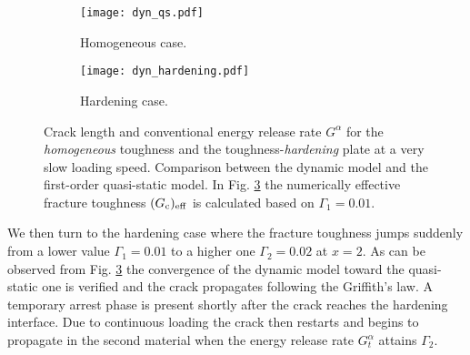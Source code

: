 \begin{figure}[htbp]
\centering
\begin{subfigure}[b]{0.48\textwidth}
\centering
\texttt{[image: dyn\_qs.pdf]}
\caption{Homogeneous case.} \label{fig:homoGcqs}
\end{subfigure}
\begin{subfigure}[b]{0.48\textwidth}
\centering
\texttt{[image: dyn\_hardening.pdf]}
\caption{Hardening case.} \label{fig:hardGcqs}
\end{subfigure}
\caption{Crack length and conventional energy release rate $G^\alpha$ for the \emph{homogeneous} toughness and the toughness-\emph{hardening} plate at a very slow loading speed. Comparison between the dynamic model and the first-order quasi-static model. In Fig. \ref{fig:hardGcqs} the numerically effective fracture toughness $(G_\mathrm{c})_\mathrm{eff}$ is calculated based on $\Gamma_1=0.01$.}
\end{figure}

We then turn to the hardening case where the fracture toughness jumps suddenly from a lower value $\Gamma_1=0.01$ to a higher one $\Gamma_2=0.02$ at $x=2$. As can be observed from Fig. \ref{fig:hardGcqs} the convergence of the dynamic model toward the quasi-static one is verified and the crack propagates following the Griffith's law. A temporary arrest phase is present shortly after the crack reaches the hardening interface. Due to continuous loading the crack then restarts and begins to propagate in the second material when the energy release rate $G^\alpha_t$ attains $\Gamma_2$.

